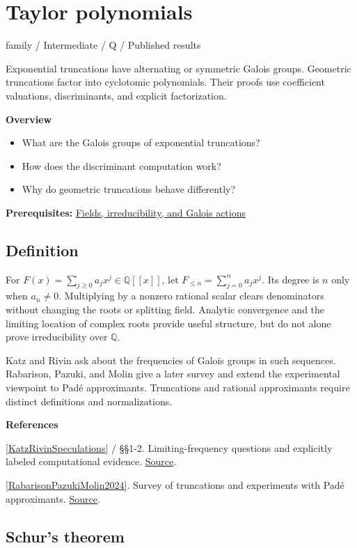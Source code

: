 \documentclass[11pt,a4paper,oneside,openany]{book}
\newenvironment{sources}{\par\smallskip\begingroup\footnotesize\color{atlasgray}\leftskip=10pt\setlength{\parskip}{2pt}}{\par\endgroup\smallskip}
\begin{document}
\chapter{Taylor polynomials}\label{article:taylor}\hypertarget{article:taylor}{}\color{black}
{\sffamily\small\color{atlasgold}family / Intermediate / Q / Published results}\par\medskip
Exponential truncations have alternating or symmetric Galois groups. Geometric truncations factor into cyclotomic polynomials. Their proofs use coefficient valuations, discriminants, and explicit factorization.\par\medskip
\textbf{Overview}\begin{itemize}
\item What are the Galois groups of exponential truncations?
\item How does the discriminant computation work?
\item Why do geometric truncations behave differently?
\end{itemize}
{\small\textbf{Prerequisites:} \hyperlink{article:foundations}{Fields, irreducibility, and Galois actions}}\par
{}\section{Definition}
\color{black} For \(F(x)=\sum_{j\ge0}a_jx^j\in\mathbb Q[[x]]\), let \(F_{\le n}=\sum_{j=0}^n a_jx^j\). Its degree is \(n\) only when \(a_n\ne0\). Multiplying by a nonzero rational scalar clears denominators without changing the roots or splitting field. Analytic convergence and the limiting location of complex roots provide useful structure, but do not alone prove irreducibility over \(\mathbb Q\).\par
\color{black} Katz and Rivin ask about the frequencies of Galois groups in such sequences. Rabarison, Pazuki, and Molin give a later survey and extend the experimental viewpoint to Padé approximants. Truncations and rational approximants require distinct definitions and normalizations.\par
\begin{sources}
\textbf{References}\par\smallskip
\noindent\hyperlink{ref:KatzRivinSpeculations}{[KatzRivinSpeculations]} / §§1-2. Limiting-frequency questions and explicitly labeled computational evidence. \href{https://web.math.princeton.edu/~nmk/kGalois_11bis.pdf}{Source}.\par
\noindent\hyperlink{ref:RabarisonPazukiMolin2024}{[RabarisonPazukiMolin2024]}. Survey of truncations and experiments with Padé approximants. \href{https://www.numdam.org/articles/10.5802/pmb.57/}{Source}.\par
\end{sources}\color{black}
\section{Schur's theorem}
\end{document}
